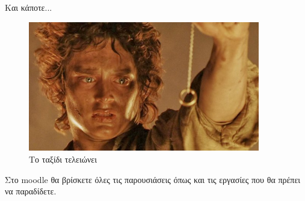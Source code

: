 \documentclass{presentation}
\begin{document}
\begin{frame}{Και κάποτε...}
      \begin{figure}
            \centering
            \includegraphics[width=0.9\textwidth]{"images/frodo2"}
            \caption{Το ταξίδι τελειώνει}
      \end{figure}
\end{frame}

\begin{frame}
      Στο moodle θα βρίσκετε όλες τις παρουσιάσεις όπως και τις εργασίες που θα πρέπει να παραδίδετε.
\end{frame}
\end{document}
